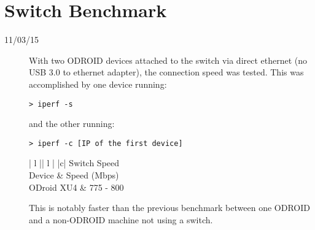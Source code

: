 \section{Switch Benchmark}
\begin{description}
\item [11/03/15] With two ODROID devices attached to the switch via direct ethernet (no USB 3.0 to ethernet adapter), the connection speed was tested. This was accomplished by one device running:
\begin{lstlisting}
> iperf -s
\end{lstlisting}
and the other running:
\begin{lstlisting}
> iperf -c [IP of the first device]
\end{lstlisting}

\begin{center}
\begin{tabular}{ | l || l | }
\hline
{}
{ |c| }{ Switch Speed } \\
\hline
Device & Speed (Mbps) \\
\hline
ODroid XU4 & 775 - 800 \\
\hline
\end{tabular}
\end{center}

This is notably faster than the previous benchmark between one ODROID and a non-ODROID machine not using a switch.
\end{description}

